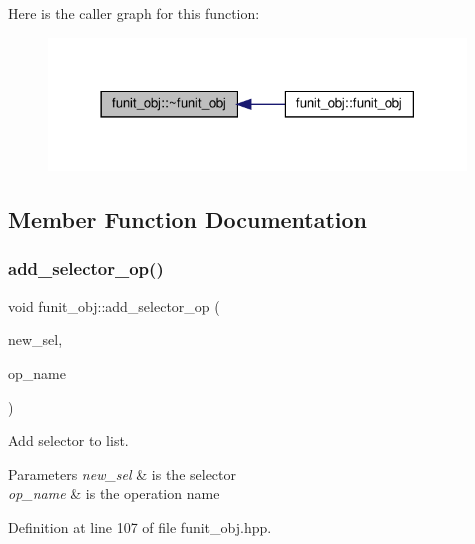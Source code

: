 Here is the caller graph for this function\+:
\nopagebreak
\begin{figure}[H]
\begin{center}
\leavevmode
\includegraphics[width=314pt]{dd/d76/classfunit__obj_aba644422f3c038297067fa9ad85b09f3_icgraph}
\end{center}
\end{figure}


\subsection{Member Function Documentation}
\mbox{\label{classfunit__obj_a307845919351a11692708a7f13de20e1}} 
\subsubsection{\texorpdfstring{add\+\_\+selector\+\_\+op()}{add\_selector\_op()}}
{\footnotesize\ttfamily void funit\+\_\+obj\+::add\+\_\+selector\+\_\+op (\begin{DoxyParamCaption}\item[{const \hyperlink{generic__obj_8hpp_acb533b2ef8e0fe72e09a04d20904ca81}{generic\+\_\+obj\+Ref} \&}]{new\+\_\+sel,  }\item[{std\+::string}]{op\+\_\+name }\end{DoxyParamCaption})\hspace{0.3cm}{\ttfamily [inline]}}



Add selector to list. 


\begin{DoxyParams}{Parameters}
{\em new\+\_\+sel} & is the selector \\
\hline
{\em op\+\_\+name} & is the operation name \\
\hline
\end{DoxyParams}


Definition at line 107 of file funit\+\_\+obj.\+hpp.


